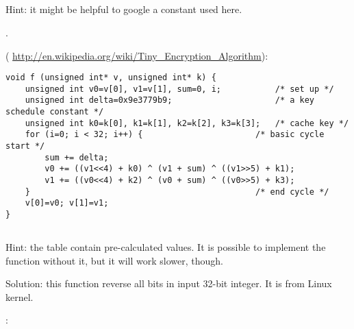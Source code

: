 \subsection{}

{Hint: it might be helpful to google a constant used here.}

.

 ( \url{http://en.wikipedia.org/wiki/Tiny_Encryption_Algorithm}):

\begin{lstlisting}
void f (unsigned int* v, unsigned int* k) {
    unsigned int v0=v[0], v1=v[1], sum=0, i;           /* set up */
    unsigned int delta=0x9e3779b9;                     /* a key schedule constant */
    unsigned int k0=k[0], k1=k[1], k2=k[2], k3=k[3];   /* cache key */
    for (i=0; i < 32; i++) {                       /* basic cycle start */
        sum += delta;
        v0 += ((v1<<4) + k0) ^ (v1 + sum) ^ ((v1>>5) + k1);
        v1 += ((v0<<4) + k2) ^ (v0 + sum) ^ ((v0>>5) + k3);  
    }                                              /* end cycle */
    v[0]=v0; v[1]=v1;
}
\end{lstlisting}

\subsection{}

{Hint: the table contain pre-calculated values.
It is possible to implement the function without it, but it will work slower, though.}

{Solution: this function reverse all bits in input 32-bit integer. 
It is  from Linux kernel.}

:

